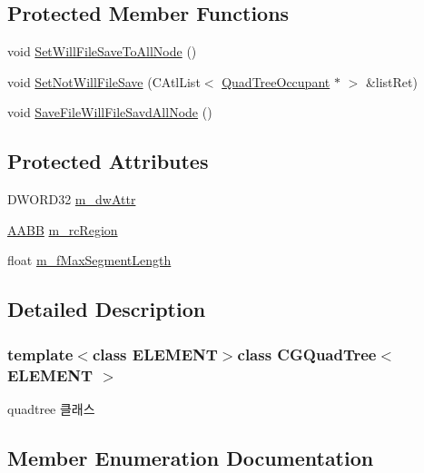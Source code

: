 \subsection*{Protected Member Functions}
\begin{DoxyCompactItemize}
\item 
void \hyperlink{class_c_g_quad_tree_a3a7ffd2954e727a42f1f12950e659673}{Set\+Will\+File\+Save\+To\+All\+Node} ()
\item 
void \hyperlink{class_c_g_quad_tree_a2169e5fa40743cf1eba4390e854bde58}{Set\+Not\+Will\+File\+Save} (C\+Atl\+List$<$ \hyperlink{class_quad_tree_occupant}{Quad\+Tree\+Occupant} $\ast$ $>$ \&list\+Ret)
\item 
void \hyperlink{class_c_g_quad_tree_aacc89b7c0b94b32cd362e9d8634391fe}{Save\+File\+Will\+File\+Savd\+All\+Node} ()
\end{DoxyCompactItemize}
\subsection*{Protected Attributes}
\begin{DoxyCompactItemize}
\item 
D\+W\+O\+R\+D32 \hyperlink{class_c_g_quad_tree_afd877e6e52d2e1a8ebf81b100f4f4b9b}{m\+\_\+dw\+Attr}
\item 
\hyperlink{struct_a_a_b_b}{A\+A\+B\+B} \hyperlink{class_c_g_quad_tree_ad2c6d0ba557e981c73c21cde5f7cdbc4}{m\+\_\+rc\+Region}
\item 
float \hyperlink{class_c_g_quad_tree_ae8d52b50ee3731209be5004325e31914}{m\+\_\+f\+Max\+Segment\+Length}
\end{DoxyCompactItemize}


\subsection{Detailed Description}
\subsubsection*{template$<$class E\+L\+E\+M\+E\+N\+T$>$class C\+G\+Quad\+Tree$<$ E\+L\+E\+M\+E\+N\+T $>$}


\begin{DoxyItemize}
\item quadtree 클래스 
\end{DoxyItemize}

\subsection{Member Enumeration Documentation}
\hypertarget{class_c_g_quad_tree_a236a06574bc2a4206959053a2339982e}{}
